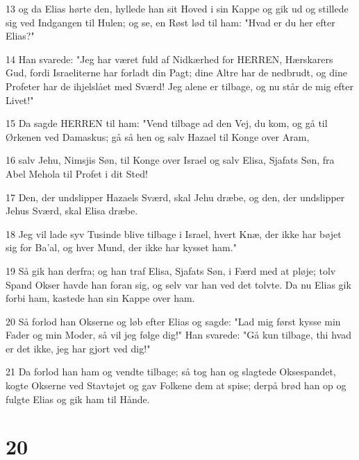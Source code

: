\par 13 og da Elias hørte den, hyllede han sit Hoved i sin Kappe og gik ud og stillede sig ved Indgangen til Hulen; og se, en Røst lød til ham: "Hvad er du her efter Elias?"
\par 14 Han svarede: "Jeg har været fuld af Nidkærhed for HERREN, Hærskarers Gud, fordi Israeliterne har forladt din Pagt; dine Altre har de nedbrudt, og dine Profeter har de ihjelslået med Sværd! Jeg alene er tilbage, og nu står de mig efter Livet!"
\par 15 Da sagde HERREN til ham: "Vend tilbage ad den Vej, du kom, og gå til Ørkenen ved Damaskus; gå så hen og salv Hazael til Konge over Aram,
\par 16 salv Jehu, Nimsjis Søn, til Konge over Israel og salv Elisa, Sjafats Søn, fra Abel Mehola til Profet i dit Sted!
\par 17 Den, der undslipper Hazaels Sværd, skal Jehu dræbe, og den, der undslipper Jehus Sværd, skal Elisa dræbe.
\par 18 Jeg vil lade syv Tusinde blive tilbage i Israel, hvert Knæ, der ikke har bøjet sig for Ba'al, og hver Mund, der ikke har kysset ham."
\par 19 Så gik han derfra; og han traf Elisa, Sjafats Søn, i Færd med at pløje; tolv Spand Okser havde han foran sig, og selv var han ved det tolvte. Da nu Elias gik forbi ham, kastede han sin Kappe over ham.
\par 20 Så forlod han Okserne og løb efter Elias og sagde: "Lad mig først kysse min Fader og min Moder, så vil jeg følge dig!" Han svarede: "Gå kun tilbage, thi hvad er det ikke, jeg har gjort ved dig!"
\par 21 Da forlod han ham og vendte tilbage; så tog han og slagtede Oksespandet, kogte Okserne ved Stavtøjet og gav Folkene dem at spise; derpå brød han op og fulgte Elias og gik ham til Hånde.

\chapter{20}

